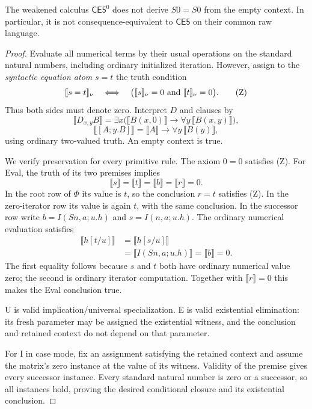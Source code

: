 \begin{theorem}
\label{thm:reflexivity-obstruction}
The weakened calculus $\mathsf{CE5}^{0}$ does not derive $S0=S0$
from the empty context. In particular, it is not consequence-equivalent
to $\mathsf{CE5}$ on their common raw language.
\end{theorem}
\begin{proof}
Evaluate all numerical terms by their usual operations on the standard
natural numbers, including ordinary initialized iteration. However,
assign to the \emph{syntactic equation atom} $s=t$ the truth condition
\[
 \llbracket s=t\rrbracket_\nu
 \quad\Longleftrightarrow\quad
 \bigl(\llbracket s\rrbracket_\nu=0
       \ \hbox{and}\ \llbracket t\rrbracket_\nu=0\bigr).
                                                        \tag{Z}
\]
Thus both sides must denote zero. Interpret $D$ and clauses by
\[
 \llbracket D_{x,y}B\rrbracket
  =\exists x\bigl(\llbracket B(x,0)\rrbracket
                  \to\forall y\,\llbracket B(x,y)\rrbracket\bigr),
\]
\[
 \llbracket[A;y.B]\rrbracket
  =\llbracket A\rrbracket\to\forall y\,\llbracket B(y)\rrbracket,
\]
using ordinary two-valued truth. An empty context is true.

We verify preservation for every primitive rule. The axiom $0=0$
satisfies (Z). For Eval, the truth of its two premises implies
\[
 \llbracket s\rrbracket
 =\llbracket t\rrbracket
 =\llbracket b\rrbracket
 =\llbracket r\rrbracket=0.
\]
In the root row of $\Phi$ its value is $t$, so the conclusion $r=t$
satisfies (Z). In the zero-iterator row its value is again $t$, with
the same conclusion. In the successor row write
$b=I(Sn,a;u.h)$ and $s=I(n,a;u.h)$. The ordinary numerical evaluation
satisfies
\[
 \begin{aligned}
 \llbracket h[t/u]\rrbracket
 &=\llbracket h[s/u]\rrbracket\\
 &=\llbracket I(Sn,a;u.h)\rrbracket
  =\llbracket b\rrbracket=0.
 \end{aligned}
\]
The first equality follows because $s$ and $t$ both have ordinary
numerical value zero; the second is ordinary iterator computation.
Together with $\llbracket r\rrbracket=0$ this makes the Eval
conclusion true.

U is valid implication/universal specialization. E is valid existential
elimination: its fresh parameter may be assigned the existential
witness, and the conclusion and retained context do not depend on
that parameter.

For I in case mode, fix an assignment satisfying the retained context
and assume the matrix's zero instance at the value of its witness.
Validity of the premise gives every successor instance. Every standard
natural number is zero or a successor, so all instances hold, proving
the desired conditional closure and its existential conclusion.


\end{proof}
